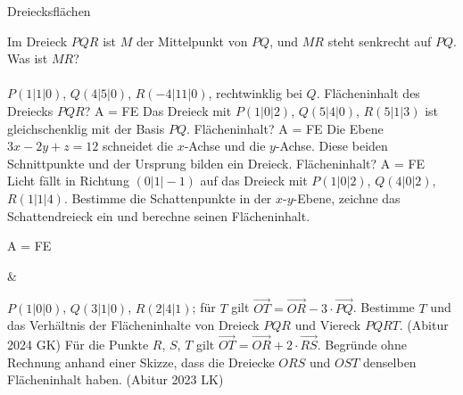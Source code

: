 \begin{aufgabe}{Dreiecksflächen}
\begin{teile}
\teil Im Dreieck $PQR$ ist $M$ der Mittelpunkt von $PQ$, und $MR$ steht senkrecht auf $PQ$. Was ist $MR$? \\  \\ 
\teil $P(1 | 1 | 0)$, $Q(4 | 5 | 0)$, $R(-4 | 11 | 0)$, rechtwinklig bei $Q$. Flächeninhalt des Dreiecks $PQR$? A = \leerfeld FE
\teil Das Dreieck mit $P(1 | 0 | 2)$, $Q(5 | 4 | 0)$, $R(5 | 1 | 3)$ ist gleichschenklig mit der Basis $PQ$. Flächeninhalt? A = \leerfeld FE
\teil Die Ebene $3x - 2y + z = 12$ schneidet die $x$-Achse und die $y$-Achse. Diese beiden Schnittpunkte und der Ursprung bilden ein Dreieck. Flächeninhalt? A = \leerfeld FE
\teil Licht fällt in Richtung $(0 | 1 | -1)$ auf das Dreieck mit $P(1 | 0 | 2)$, $Q(4 | 0 | 2)$, $R(1 | 1 | 4)$. Bestimme die Schattenpunkte in der $x$-$y$-Ebene, zeichne das Schattendreieck ein und berechne seinen Flächeninhalt.

\begin{ksys3}[x1min=-1,x1max=6,x2min=-1,x2max=6,x3min=0,x3max=5]    \end{ksys3}
A = \leerfeld FE
\end{teile}
\begin{gleichungsraster}[2]
 &
\end{gleichungsraster}
\begin{teile}
\teil $P(1 | 0 | 0)$, $Q(3 | 1 | 0)$, $R(2 | 4 | 1)$; für $T$ gilt $\overrightarrow{OT} = \overrightarrow{OR} - 3 \cdot \overrightarrow{PQ}$. Bestimme $T$ und das Verhältnis der Flächeninhalte von Dreieck $PQR$ und Viereck $PQRT$. \hfill (Abitur 2024 GK)
\teil Für die Punkte $R$, $S$, $T$ gilt $\overrightarrow{OT} = \overrightarrow{OR} + 2 \cdot \overrightarrow{RS}$. Begründe ohne Rechnung anhand einer Skizze, dass die Dreiecke $ORS$ und $OST$ denselben Flächeninhalt haben. \hfill (Abitur 2023 LK)
\end{teile}
\end{aufgabe}

